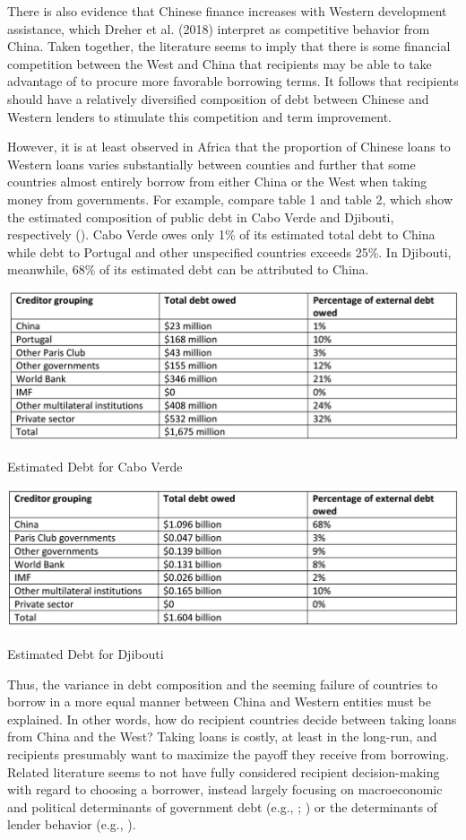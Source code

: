 \documentclass{article}
\begin{document}
There is also evidence that Chinese finance increases with Western development assistance, which Dreher et al. (2018)\nocite{dreher2018} interpret as competitive behavior from China. Taken together, the literature seems to imply that there is some financial competition between the West and China that recipients may be able to take advantage of to procure more favorable borrowing terms. It follows that recipients should have a relatively diversified composition of debt between Chinese and Western lenders to stimulate this competition and term improvement.

However, it is at least observed in Africa that the proportion of Chinese loans to Western loans varies substantially between counties and further that some countries almost entirely borrow from either China or the West when taking money from governments. For example, compare table 1 and table 2, which show the estimated composition of public debt in Cabo Verde and Djibouti, respectively (\cite{jubileedebtcampaign2018}). Cabo Verde owes only 1\% of its estimated total debt to China while debt to Portugal and other unspecified countries exceeds 25\%. In Djibouti, meanwhile, 68\% of its estimated debt can be attributed to China.

\begin{table}
    \centering
    \includegraphics[scale=0.5]{Figures/CaboVerde.png}
    \caption{Estimated Debt for Cabo Verde}
    \vspace{1cm}
    \includegraphics[scale=0.5025]{Figures/Djibouti.png}
    \caption{Estimated Debt for Djibouti}
\end{table}

Thus, the variance in debt composition and the seeming failure of countries to borrow in a more equal manner between China and Western entities must be explained. In other words, how do recipient countries decide between taking loans from China and the West? Taking loans is costly, at least in the long-run, and recipients presumably want to maximize the payoff they receive from borrowing. Related literature seems to not have fully considered recipient decision-making with regard to choosing a borrower, instead largely focusing on macroeconomic and political determinants of government debt (e.g., \cite{bittencourt2015} ; \cite{swamy2015}) or the determinants of lender behavior (e.g., \cite{dreher2018}).
\end{document}
